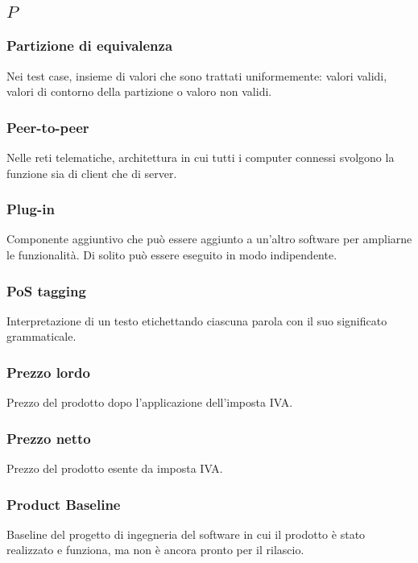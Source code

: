 \subsection*{\quad$P\quad$}
\subsubsection*{Partizione di equivalenza}
Nei test case, insieme di valori che sono trattati uniformemente: valori validi, valori di contorno della partizione o valoro non validi.

\subsubsection*{Peer-to-peer}
Nelle reti telematiche, architettura in cui tutti i computer connessi svolgono la funzione sia di client che di server.

\subsubsection*{Plug-in}
Componente aggiuntivo che può essere aggiunto a un'altro software per ampliarne le funzionalità. Di solito può essere eseguito in modo indipendente.

\subsubsection*{PoS tagging}
Interpretazione di un testo etichettando ciascuna parola con il suo significato grammaticale.

\subsubsection*{Prezzo lordo}
Prezzo del prodotto dopo l'applicazione dell'imposta IVA.

\subsubsection*{Prezzo netto}
Prezzo del prodotto esente da imposta IVA.

\subsubsection*{Product Baseline}
Baseline del progetto di ingegneria del software in cui il prodotto è stato realizzato e funziona, ma non è ancora pronto per il rilascio.

